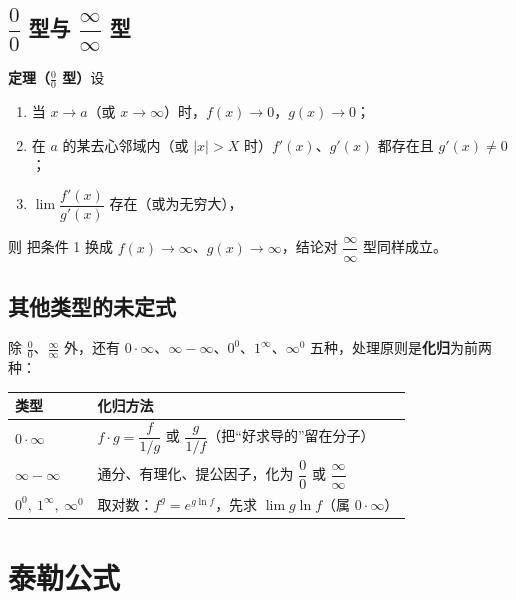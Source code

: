 \subsection{$\dfrac00$ 型与 $\dfrac{\infty}{\infty}$ 型}
\textbf{定理（$\frac00$ 型）}\quad 设
\begin{enumerate}
    \item 当 $x\to a$（或 $x\to\infty$）时，$f(x)\to0$，$g(x)\to0$；
    \item 在 $a$ 的某去心邻域内（或 $|x|>X$ 时）$f'(x)$、$g'(x)$ 都存在且 $g'(x)\neq0$；
    \item $\lim\dfrac{f'(x)}{g'(x)}$ 存在（或为无穷大），
\end{enumerate}
则
\noindent 把条件 1 换成 $f(x)\to\infty$、$g(x)\to\infty$，结论对 $\dfrac{\infty}{\infty}$ 型同样成立。

\subsection{其他类型的未定式}
除 $\frac00$、$\frac{\infty}{\infty}$ 外，还有 $0\cdot\infty$、$\infty-\infty$、$0^0$、$1^{\infty}$、$\infty^0$ 五种，处理原则是\textbf{化归}为前两种：
\begin{center}
\begin{tabular}{@{}ll@{}}
\toprule
类型 & 化归方法 \\
\midrule
$0\cdot\infty$ & $f\cdot g=\dfrac{f}{1/g}$ 或 $\dfrac{g}{1/f}$（把“好求导的”留在分子） \\
$\infty-\infty$ & 通分、有理化、提公因子，化为 $\dfrac00$ 或 $\dfrac{\infty}{\infty}$ \\
$0^0,\ 1^{\infty},\ \infty^0$ & 取对数：$f^{g}=e^{g\ln f}$，先求 $\lim g\ln f$（属 $0\cdot\infty$） \\
\bottomrule
\end{tabular}
\end{center}


\section{泰勒公式}

